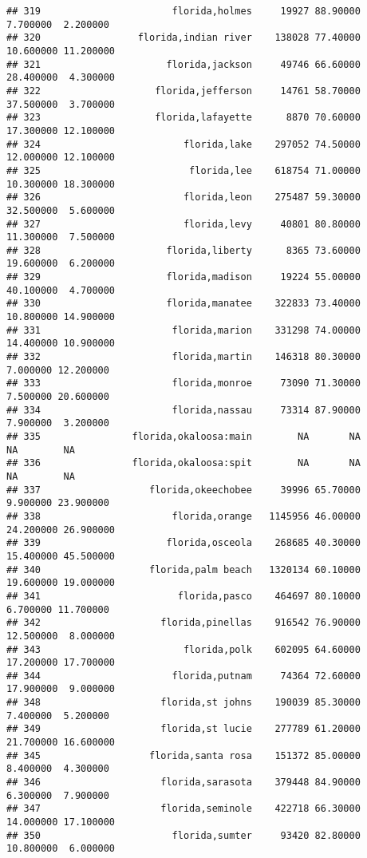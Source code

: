 \documentclass[
]{article}
\begin{document}
\begin{verbatim}
## 319                       florida,holmes     19927 88.90000  7.700000  2.200000
## 320                 florida,indian river    138028 77.40000 10.600000 11.200000
## 321                      florida,jackson     49746 66.60000 28.400000  4.300000
## 322                    florida,jefferson     14761 58.70000 37.500000  3.700000
## 323                    florida,lafayette      8870 70.60000 17.300000 12.100000
## 324                         florida,lake    297052 74.50000 12.000000 12.100000
## 325                          florida,lee    618754 71.00000 10.300000 18.300000
## 326                         florida,leon    275487 59.30000 32.500000  5.600000
## 327                         florida,levy     40801 80.80000 11.300000  7.500000
## 328                      florida,liberty      8365 73.60000 19.600000  6.200000
## 329                      florida,madison     19224 55.00000 40.100000  4.700000
## 330                      florida,manatee    322833 73.40000 10.800000 14.900000
## 331                       florida,marion    331298 74.00000 14.400000 10.900000
## 332                       florida,martin    146318 80.30000  7.000000 12.200000
## 333                       florida,monroe     73090 71.30000  7.500000 20.600000
## 334                       florida,nassau     73314 87.90000  7.900000  3.200000
## 335                florida,okaloosa:main        NA       NA        NA        NA
## 336                florida,okaloosa:spit        NA       NA        NA        NA
## 337                   florida,okeechobee     39996 65.70000  9.900000 23.900000
## 338                       florida,orange   1145956 46.00000 24.200000 26.900000
## 339                      florida,osceola    268685 40.30000 15.400000 45.500000
## 340                   florida,palm beach   1320134 60.10000 19.600000 19.000000
## 341                        florida,pasco    464697 80.10000  6.700000 11.700000
## 342                     florida,pinellas    916542 76.90000 12.500000  8.000000
## 343                         florida,polk    602095 64.60000 17.200000 17.700000
## 344                       florida,putnam     74364 72.60000 17.900000  9.000000
## 348                     florida,st johns    190039 85.30000  7.400000  5.200000
## 349                     florida,st lucie    277789 61.20000 21.700000 16.600000
## 345                   florida,santa rosa    151372 85.00000  8.400000  4.300000
## 346                     florida,sarasota    379448 84.90000  6.300000  7.900000
## 347                     florida,seminole    422718 66.30000 14.000000 17.100000
## 350                       florida,sumter     93420 82.80000 10.800000  6.000000

\end{verbatim}
\end{document}
